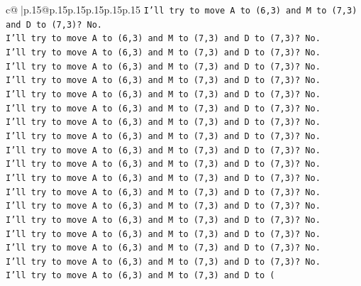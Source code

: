 \documentclass{article}
\begin{document}
{\begin{supertabular}{c@{$\;$}|p{.15\linewidth}@{}p{.15\linewidth}p{.15\linewidth}p{.15\linewidth}p{.15\linewidth}p{.15\linewidth}}
{{{\texttt{I'll try to move A to (6,3) and M to (7,3) and D to (7,3)? No.} \\
\texttt{I'll try to move A to (6,3) and M to (7,3) and D to (7,3)? No.} \\
\texttt{I'll try to move A to (6,3) and M to (7,3) and D to (7,3)? No.} \\
\texttt{I'll try to move A to (6,3) and M to (7,3) and D to (7,3)? No.} \\
\texttt{I'll try to move A to (6,3) and M to (7,3) and D to (7,3)? No.} \\
\texttt{I'll try to move A to (6,3) and M to (7,3) and D to (7,3)? No.} \\
\texttt{I'll try to move A to (6,3) and M to (7,3) and D to (7,3)? No.} \\
\texttt{I'll try to move A to (6,3) and M to (7,3) and D to (7,3)? No.} \\
\texttt{I'll try to move A to (6,3) and M to (7,3) and D to (7,3)? No.} \\
\texttt{I'll try to move A to (6,3) and M to (7,3) and D to (7,3)? No.} \\
\texttt{I'll try to move A to (6,3) and M to (7,3) and D to (7,3)? No.} \\
\texttt{I'll try to move A to (6,3) and M to (7,3) and D to (7,3)? No.} \\
\texttt{I'll try to move A to (6,3) and M to (7,3) and D to (7,3)? No.} \\
\texttt{I'll try to move A to (6,3) and M to (7,3) and D to (7,3)? No.} \\
\texttt{I'll try to move A to (6,3) and M to (7,3) and D to (7,3)? No.} \\
\texttt{I'll try to move A to (6,3) and M to (7,3) and D to (7,3)? No.} \\
\texttt{I'll try to move A to (6,3) and M to (7,3) and D to (7,3)? No.} \\
\texttt{I'll try to move A to (6,3) and M to (7,3) and D to (7,3)? No.} \\
\texttt{I'll try to move A to (6,3) and M to (7,3) and D to (} \\
            }
        }
    }
     \\ \\


\end{supertabular}}
\end{document}
